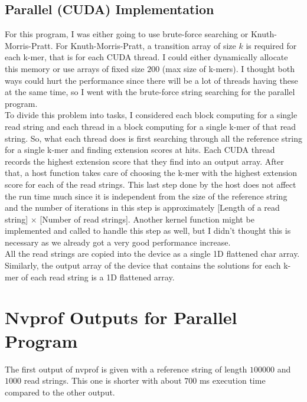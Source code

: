 \documentclass{article}
\begin{document}
\subsection{Parallel (CUDA) Implementation}
For this program, I was either going to use brute-force searching or Knuth-Morris-Pratt. For Knuth-Morris-Pratt, a transition array of size $k$ is required for each k-mer, that is for each CUDA thread. I could either dynamically allocate this memory or use arrays of fixed size $200$ (max size of k-mers). I thought both ways could hurt the performance since there will be a lot of threads having these at the same time, so I went with the brute-force string searching for the parallel program. \\

To divide this problem into tasks, I considered each block computing for a single read string and each thread in a block computing for a single k-mer of that read string. So, what each thread does is first searching through all the reference string for a single k-mer and finding extension scores at hits. Each CUDA thread records the highest extension score that they find into an output array. After that, a host function takes care of choosing the k-mer with the highest extension score for each of the read strings. This last step done by the host does not affect the run time much since it is independent from the size of the reference string and the number of iterations in this step is approximately [Length of a read string] $\times$ [Number of read strings]. Another kernel function might be implemented and called to handle this step as well, but I didn't thought this is necessary as we already got a very good performance increase.\\

All the read strings are copied into the device as a single 1D flattened char array. Similarly, the output array of the device that contains the solutions for each k-mer of each read string is a 1D flattened array.

\section{Nvprof Outputs for Parallel Program}

The first output of nvprof is given with a reference string of length $100000$ and $1000$ read strings. This one is shorter with about $700$ ms execution time compared to the other output.
\end{document}
